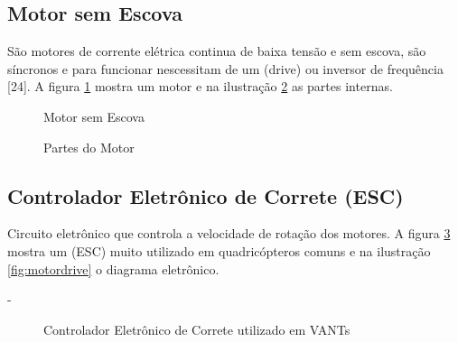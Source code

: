 \subsection{Motor sem Escova}
São motores de corrente elétrica continua de baixa tensão e sem escova, são síncronos e para funcionar nescessitam de um (drive) ou inversor de frequência [24]. A figura \ref{fig:motor} mostra um motor e na ilustração \ref{fig:motorpart} as partes internas.
%
\begin{figure}[H]
	\centering
	\caption{Motor sem Escova}
	\fontsize{9pt}{12pt}\selectfont
	\def\svgwidth{13cm}
	
	\label{fig:motor}
\end{figure}


\begin{figure}[H]
	\centering
	\caption{Partes do Motor}
	\fontsize{9pt}{12pt}\selectfont
	\def\svgwidth{13cm}
	
	\label{fig:motorpart}
\end{figure}

\subsection{Controlador Eletrônico de Correte (ESC)}
Circuito eletrônico que controla a velocidade de rotação dos motores. A figura \ref{fig:esc} mostra um (ESC) muito utilizado em quadricópteros comuns e na ilustração \ref{fig:motordrive} o diagrama eletrônico.

-
\begin{figure}[H]
	\centering
	\caption{Controlador Eletrônico de Correte utilizado em VANTs}
	\fontsize{9pt}{12pt}\selectfont
	\def\svgwidth{13cm}
	
	\label{fig:esc}
\end{figure}

